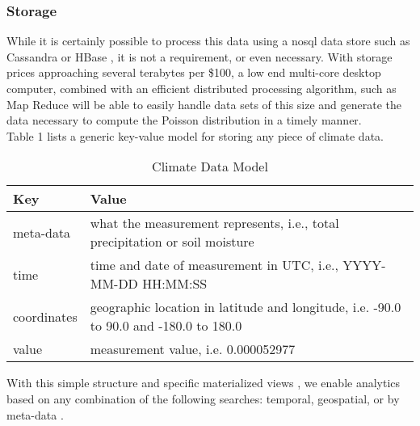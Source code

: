 \subsubsection{Storage}
While it is certainly possible to process this data using a \gls{nosql} data store such as Cassandra \cite{cassandra} or HBase \cite{Hbase}, it is not a requirement, or even necessary. With storage prices approaching several terabytes per \$100, a low end multi-core desktop computer, combined with an efficient distributed processing algorithm, such as Map Reduce \cite{mapreduce} will be able to easily handle data sets of this size and generate the data necessary to compute the Poisson distribution in a timely manner.\\

Table 1 lists a generic key-value model for storing any piece of climate data.
\begin{table}[htbp]
	\caption{Climate Data Model}
	\centering
	\begin{tabular}{l l}
		\hline
		Key & Value \\ [0.5ex]
		\hline
		meta-data & what the measurement represents, i.e., total precipitation or soil moisture\\
		time & time and date of measurement in UTC, i.e., YYYY-MM-DD HH:MM:SS\\
		coordinates & geographic location in latitude and longitude, i.e. -90.0 to 90.0 and -180.0 to 180.0\\
		value & measurement value, i.e. 0.000052977\\
		\hline
	\end{tabular}
\end{table}
With this simple structure and specific materialized views , we enable analytics based on any combination of the following searches: temporal, geospatial, or by meta-data \cite{materialized_views}. 